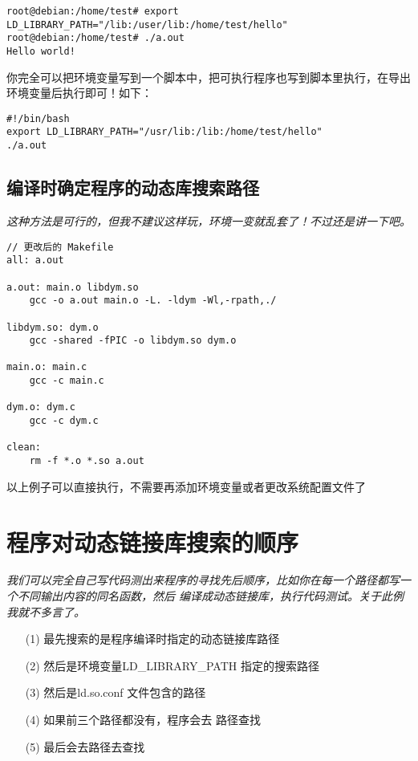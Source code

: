 \documentclass{article}
\begin{document}
\begin{verbatim}
root@debian:/home/test# export LD_LIBRARY_PATH="/lib:/user/lib:/home/test/hello"
root@debian:/home/test# ./a.out 
Hello world!
\end{verbatim}

你完全可以把环境变量写到一个脚本中，把可执行程序也写到脚本里执行，在导出环境变量后执行即可！如下：

\begin{verbatim}
#!/bin/bash
export LD_LIBRARY_PATH="/usr/lib:/lib:/home/test/hello"
./a.out
\end{verbatim}

\subsection{编译时确定程序的动态库搜索路径}
\textit{
这种方法是可行的，但我不建议这样玩，环境一变就乱套了！不过还是讲一下吧。
}

\begin{verbatim}
// 更改后的 Makefile
all: a.out

a.out: main.o libdym.so
	gcc -o a.out main.o -L. -ldym -Wl,-rpath,./

libdym.so: dym.o
	gcc -shared -fPIC -o libdym.so dym.o

main.o: main.c
	gcc -c main.c

dym.o: dym.c
	gcc -c dym.c

clean: 
	rm -f *.o *.so a.out

\end{verbatim}

以上例子可以直接执行，不需要再添加环境变量或者更改系统配置文件了

\section{程序对动态链接库搜索的顺序}
\textit{
我们可以完全自己写代码测出来程序的寻找先后顺序，比如你在每一个路径都写一个不同输出内容的同名函数，然后
编译成动态链接库，执行代码测试。关于此例我就不多言了。
}

\begin{itemize}
\item[(1)] 最先搜索的是程序编译时指定的动态链接库路径
\item[(2)] 然后是环境变量LD\_LIBRARY\_PATH 指定的搜索路径
\item[(3)] 然后是ld.so.conf 文件包含的路径
\item[(4)] 如果前三个路径都没有，程序会去 路径查找
\item[(5)] 最后会去路径去查找
\end{itemize}
\end{document}
